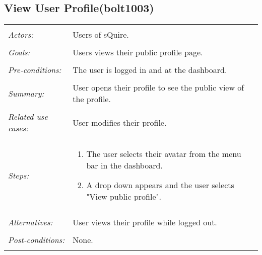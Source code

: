 \subsection{View User Profile(bolt1003)}
\begin{tabular}{ p{2cm} p{12cm} }
 \hline
 \\
 \textit{Actors:} & Users of sQuire. \\ 
 \\
 \textit{Goals:} & Users views their public profile page. \\
 \\
 \textit{Pre-conditions:} & The user is logged in and at the dashboard. \\
 \\
 \textit{Summary:} & User opens their profile to see the public view of the profile.\\ 
 \\
 \textit{Related use cases:} & User modifies their profile. \\ 
 \\
 \textit{Steps:} & \begin{enumerate}
  \item The user selects their avatar from the menu bar in the dashboard.
  \item A drop down appears and the user selects "View public profile".
 \end{enumerate} \\
 \\
 \textit{Alternatives:} & User views their profile while logged out. \\
 \\
 \textit{Post-conditions:} & None. \\
 \\
\hline
\end{tabular}

